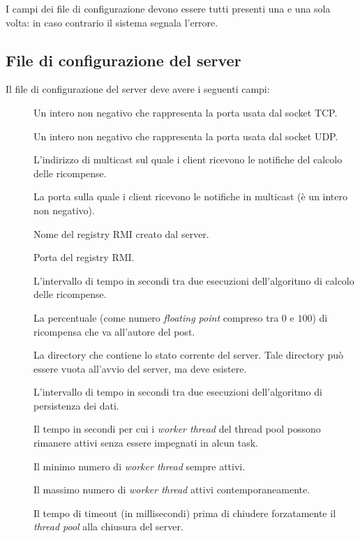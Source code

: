 \documentclass[
    oneside,
    10pt,
    language=italian,
    a4paper,
    article
]{notes}
\begin{document}
I campi dei file di configurazione devono essere tutti presenti una e una sola 
volta: in caso contrario il sistema segnala l'errore.

\subsection{File di configurazione del server}
Il file di configurazione del server deve avere i seguenti campi:
\begin{description}
    \item[] Un intero non negativo che rappresenta la porta usata dal socket TCP. 
    \item[] Un intero non negativo che rappresenta la porta usata dal socket UDP.
    \item[] L'indirizzo di multicast sul quale i client ricevono
        le notifiche del calcolo delle ricompense.
    \item[] La porta sulla quale i client ricevono le notifiche
        in multicast (è un intero non negativo).
    \item[] Nome del registry RMI creato dal server.
    \item[] Porta del registry RMI.
    \item[] L'intervallo di tempo in secondi tra due esecuzioni
        dell'algoritmo di calcolo delle ricompense.
    \item[] La percentuale (come numero \emph{floating point}
        compreso tra $0$ e $100$) di ricompensa che va all'autore del post.
    \item[] La directory che contiene lo stato corrente del server.
        Tale directory può essere vuota all'avvio del server, ma deve esistere.
    \item[] L'intervallo di tempo in secondi tra due
        esecuzioni dell'algoritmo di persistenza dei dati.
    \item[] Il tempo in secondi per cui i \emph{worker thread} del
        thread pool possono rimanere attivi senza essere impegnati in alcun task.
    \item[] Il minimo numero di \emph{worker thread} sempre attivi.
    \item[] Il massimo numero di \emph{worker thread} attivi contemporaneamente.
    \item[] Il tempo di timeout (in millisecondi) prima di chiudere
        forzatamente il \emph{thread pool} alla chiusura del server.         
\end{description}
\end{document}
